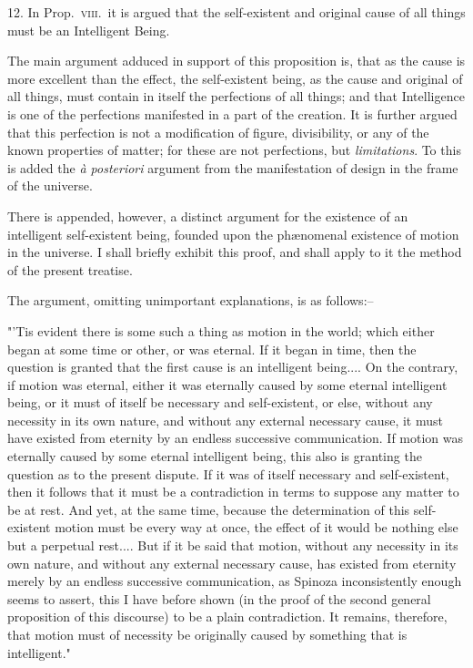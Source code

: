 \documentclass[oneside]{book}
\begin{document}
12. In Prop.~\textsc{viii}.\ it is argued that the self-existent and original cause of all things must be an Intelligent Being.

The main argument adduced in support of this proposition is,
that as the cause is more excellent than the effect, the self-existent being, as the cause and original of all things, must contain
in itself the perfections of all things; and that Intelligence
is one of the perfections manifested in a part of the creation. It
is further argued that this perfection is not a modification of
figure, divisibility, or any of the known properties of matter;
for these are not perfections, but \textit{limitations}. To this is added
the \textit{\`{a} posteriori} argument from the manifestation of design in the
frame of the universe.

There is appended, however, a distinct argument for the
existence of an intelligent self-existent being, founded upon the
ph{\ae}nomenal existence of motion in the universe. I shall briefly
exhibit this proof, and shall apply to it the method of the present
treatise.

The argument, omitting unimportant explanations, is as follows:--

"'Tis evident there is some such a thing as motion in the
world; which either began at some time or other, or was eternal.
If it began in time, then the question is granted that the first
cause is an intelligent being.... On the contrary, if motion was
eternal, either it was eternally caused by some eternal intelligent
being, or it must of itself be necessary and self-existent, or else,
without any necessity in its own nature, and without any external
necessary cause, it must have existed from eternity by an endless
successive communication. If motion was eternally caused by
some eternal intelligent being, this also is granting the question
as to the present dispute. If it was of itself necessary and self-existent,
then it follows that it must be a contradiction in terms
to suppose any matter to be at rest. And yet, at the same time,
because the determination of this self-existent motion must be
every way at once, the effect of it would be nothing else but a
perpetual rest.... But if it be said that motion, without any necessity
in its own nature, and without any external necessary
cause, has existed from eternity merely by an endless successive
communication, as Spinoza inconsistently enough seems to assert,
this I have before shown (in the proof of the second general
proposition of this discourse) to be a plain contradiction. It remains,
therefore, that motion must of necessity be originally
caused by something that is intelligent."
\end{document}
